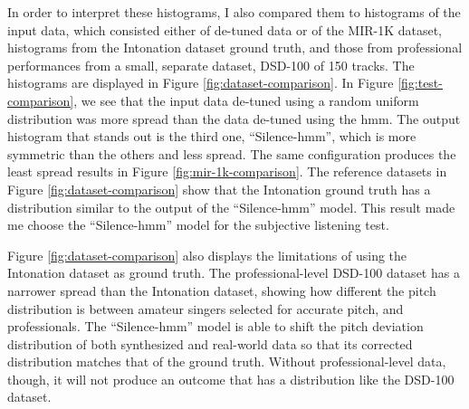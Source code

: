 In order to interpret these histograms, I also compared them to histograms of the input data, which consisted either of de-tuned data or of the MIR-1K dataset, histograms from the Intonation dataset ground truth, and those from professional performances from a small, separate dataset, DSD-100 \cite{SiSEC16} of 150 tracks. The histograms are displayed in Figure \ref{fig:dataset-comparison}. In Figure \ref{fig:test-comparison}, we see that the input data de-tuned using a random uniform distribution was more spread than the data de-tuned using the \gls{hmm}. The output histogram that stands out is the third one, ``Silence-\gls{hmm}'', which is more symmetric than the others and less spread. The same configuration produces the least spread results in Figure \ref{fig:mir-1k-comparison}. The reference datasets in Figure \ref{fig:dataset-comparison} show that the Intonation ground truth has a distribution similar to the output of the ``Silence-\gls{hmm}'' model. This result made me choose the ``Silence-\gls{hmm}'' model for the subjective listening test.

Figure \ref{fig:dataset-comparison} also displays the limitations of using the Intonation dataset as ground truth. The professional-level DSD-100 dataset has a narrower spread than the Intonation dataset, showing how different the pitch distribution is between amateur singers selected for accurate pitch, and professionals. The ``Silence-\gls{hmm}'' model is able to shift the pitch deviation distribution of both synthesized and real-world data so that its corrected distribution matches that of the ground truth. Without professional-level data, though, it will not produce an outcome that has a distribution like the DSD-100 dataset.

